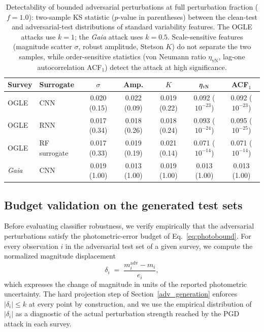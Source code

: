 \documentclass{aa}
\begin{document}
\begin{table}[htbp]
\caption{Detectability of bounded adversarial perturbations at full perturbation fraction ($f=1.0$): two-sample KS statistic ($p$-value in parentheses) between the clean-test and adversarial-test distributions of standard variability features. The OGLE attacks use $k=1$; the \textit{Gaia} attack uses $k=0.5$. Scale-sensitive features (magnitude scatter $\sigma$, robust amplitude, Stetson $K$) do not separate the two samples, while order-sensitive statistics (von Neumann ratio $\eta_{\mathrm{vN}}$, lag-one autocorrelation ACF$_1$) detect the attack at high significance.}
\label{tab:detectability}
\centering
\small
\begin{tabular}{llccccc}
\hline\hline
Survey & Surrogate & $\sigma$ & Amp. & $K$ & $\eta_{\rm vN}$ & ACF$_1$ \\
\hline
OGLE & CNN & 0.020 (0.15) & 0.022 (0.09) & 0.019 (0.22) & 0.092 ($10^{-23}$) & 0.092 ($10^{-23}$) \\
OGLE & RNN & 0.017 (0.34) & 0.018 (0.26) & 0.018 (0.24) & 0.093 ($10^{-24}$) & 0.095 ($10^{-25}$) \\
OGLE & RF surrogate & 0.017 (0.33) & 0.019 (0.19) & 0.021 (0.14) & 0.071 ($10^{-14}$) & 0.071 ($10^{-14}$) \\
\textit{Gaia} & CNN & 0.019 (1.00) & 0.013 (1.00) & 0.019 (1.00) & 0.013 (1.00) & 0.013 (1.00) \\
\hline
\end{tabular}
\end{table}


\subsection{Budget validation on the generated test sets}
\label{sec:val_perturb}


Before evaluating classifier robustness, we verify empirically that the
adversarial perturbations satisfy the photometric-error budget of
Eq.~\eqref{eq:photobound}. For every observation $i$ in the adversarial test
set of a given survey, we compute the normalized magnitude displacement
\begin{equation}
\delta_i \;=\; \frac{m^{\mathrm{adv}}_i - m_i}{e_i},
\end{equation}
which expresses the change of magnitude in units of the reported photometric
uncertainty. The hard projection step of Section~\ref{adv_generation}
enforces $|\delta_i| \le k$ at every point by construction, and we use the
empirical distribution of $|\delta_i|$ as a diagnostic of the actual
perturbation strength reached by the PGD attack in each survey.
\end{document}
